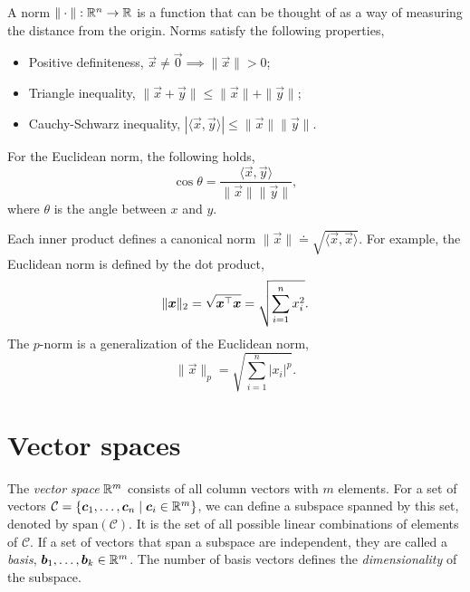 \documentclass[justified,nobib]{tufte-handout}
\newcommand{\ang}[1]{\langle #1 \rangle}
\begin{document}
\begin{definition}[Norm]
    A norm $\|\cdot\|: \mathbb{R}^n \to \mathbb{R}$ is a function that can be thought of as a way of measuring the distance from the origin.
    Norms satisfy the following properties,
    \begin{itemize}
        \item Positive definiteness, $\vec{x} \neq \vec{0} \implies \|\vec{x}\| > 0$;
        \item Triangle inequality, $\|\vec{x}+\vec{y}\| \leq \|\vec{x}\| + \|\vec{y}\|$;
        \item Cauchy-Schwarz inequality, $|\ang{\vec{x},\vec{y}}| \leq \|\vec{x}\| \|\vec{y}\|$.
    \end{itemize}
\end{definition}

\begin{corollary}
    For the Euclidean norm, the following holds, \[
        \cos \theta = \frac{\ang{\vec{x},\vec{y}}}{\|\vec{x}\| \|\vec{y}\|},
    \]
    where $\theta$ is the angle between $x$ and $y$.
\end{corollary}

Each inner product defines a canonical norm $\|\vec{x}\| \doteq \sqrt{\ang{\vec{x},\vec{x}}}$. For example, the Euclidean
norm is defined by the dot product, \[
    \|\bm{x}\|_2 = \sqrt{\bm{x}^\top\bm{x}} = \sqrt{\sum_{i=1}^{n} x_i^2}.
\]
The $p$-norm is a generalization of the Euclidean norm, \[
    \|\vec{x}\|_p = \sqrt{\sum_{i=1}^{n} |x_i|^p}.
\]

\section{Vector spaces}

The \textit{vector space} $\mathbb{R}^m$ consists of all column vectors with $m$ elements. For a set of vectors 
$\mathcal{C} = \{ \bm{c}_1,\ldots,\bm{c}_n \mid \bm{c}_i \in \mathbb{R}^m \}$, we can define a subspace spanned
by this set, denoted by $\mathrm{span}(\mathcal{C})$. It is the set of all possible linear combinations of
elements of $\mathcal{C}$. If a set of vectors that span a subspace are independent, they are called a 
\textit{basis}, $\bm{b}_1,\ldots,\bm{b}_k \in \mathbb{R}^m$. The number of basis vectors defines the \textit{dimensionality}
of the subspace.
\end{document}
